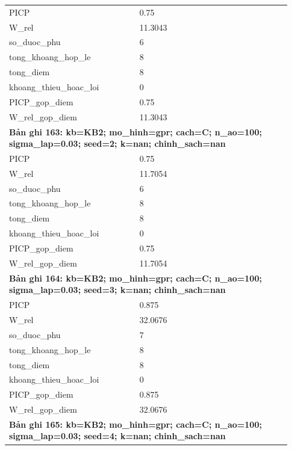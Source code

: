 \begin{longtable}{p{0.43\linewidth}p{0.50\linewidth}}
PICP & 0.75 \\
W\_\allowbreak rel & 11.3043 \\
so\_\allowbreak duoc\_\allowbreak phu & 6 \\
tong\_\allowbreak khoang\_\allowbreak hop\_\allowbreak le & 8 \\
tong\_\allowbreak diem & 8 \\
khoang\_\allowbreak thieu\_\allowbreak hoac\_\allowbreak loi & 0 \\
PICP\_\allowbreak gop\_\allowbreak diem & 0.75 \\
W\_\allowbreak rel\_\allowbreak gop\_\allowbreak diem & 11.3043 \\
\midrule
\multicolumn{2}{p{0.95\linewidth}}{\textbf{Bản ghi 163: kb=KB2; mo\_hinh=gpr; cach=C; n\_ao=100; sigma\_lap=0.03; seed=2; k=nan; chinh\_sach=nan}} \\
PICP & 0.75 \\
W\_\allowbreak rel & 11.7054 \\
so\_\allowbreak duoc\_\allowbreak phu & 6 \\
tong\_\allowbreak khoang\_\allowbreak hop\_\allowbreak le & 8 \\
tong\_\allowbreak diem & 8 \\
khoang\_\allowbreak thieu\_\allowbreak hoac\_\allowbreak loi & 0 \\
PICP\_\allowbreak gop\_\allowbreak diem & 0.75 \\
W\_\allowbreak rel\_\allowbreak gop\_\allowbreak diem & 11.7054 \\
\midrule
\multicolumn{2}{p{0.95\linewidth}}{\textbf{Bản ghi 164: kb=KB2; mo\_hinh=gpr; cach=C; n\_ao=100; sigma\_lap=0.03; seed=3; k=nan; chinh\_sach=nan}} \\
PICP & 0.875 \\
W\_\allowbreak rel & 32.0676 \\
so\_\allowbreak duoc\_\allowbreak phu & 7 \\
tong\_\allowbreak khoang\_\allowbreak hop\_\allowbreak le & 8 \\
tong\_\allowbreak diem & 8 \\
khoang\_\allowbreak thieu\_\allowbreak hoac\_\allowbreak loi & 0 \\
PICP\_\allowbreak gop\_\allowbreak diem & 0.875 \\
W\_\allowbreak rel\_\allowbreak gop\_\allowbreak diem & 32.0676 \\
\midrule
\multicolumn{2}{p{0.95\linewidth}}{\textbf{Bản ghi 165: kb=KB2; mo\_hinh=gpr; cach=C; n\_ao=100; sigma\_lap=0.03; seed=4; k=nan; chinh\_sach=nan}} \\

\end{longtable}

